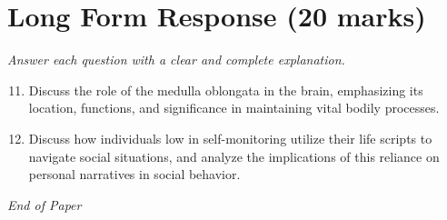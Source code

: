 \documentclass[12pt]{article}
\begin{document}
\section*{Long Form Response (20 marks)}
\textit{Answer each question with a clear and complete explanation.}
\begin{enumerate}[label=\arabic*.]
\setcounter{enumi}{10}
\item Discuss the role of the medulla oblongata in the brain, emphasizing its location, functions, and significance in maintaining vital bodily processes.
\item Discuss how individuals low in self-monitoring utilize their life scripts to navigate social situations, and analyze the implications of this reliance on personal narratives in social behavior.
\end{enumerate}

\vfill
\noindent\textit{End of Paper}
\end{document}
